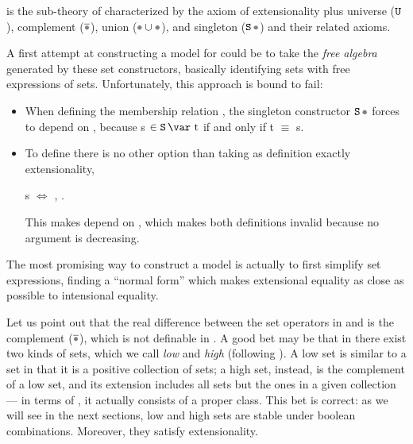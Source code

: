 
\renewcommand\INX{\coqref{NF2.Model.IN}{{\IN}}~}
\renewcommand\EQX{\coqref{NF2.Model.EQ}{{\EQ}}~}

\NFTWO{} is the sub-theory of \NF{} characterized by the axiom of extensionality plus universe ($\text{\texttt{U}}$), complement ($\Complement \Placeholder$), union ($\Union \Placeholder \Placeholder$), and singleton ($\Sing\Placeholder$) and their related axioms.


\medskip

A first attempt at constructing a model for \NFTWO{} could be to take the \emph{free algebra} generated by these set constructors, basically identifying sets with free expressions of sets. Unfortunately, this approach is bound to fail:

\begin{itemize}
  \item 
  When defining the membership relation , the singleton constructor $\Sing\Placeholder$ forces  to depend on , because \var s $\in \Sing{\text{\var t}}$ if and only if \var t $\equiv$ \var s.
  \item To define  there is no other option than taking as definition exactly extensionality, \ie{} \\
  \centerline{
   \var s  $\Leftrightarrow$ \coqdockw{\ensuremath{\forall}} ,       .}
  
  This makes  depend on , which makes both definitions invalid because no argument is decreasing.
\end{itemize}

The most promising way to construct a model is actually to first simplify set expressions, finding a ``normal form'' which makes extensional equality as close as possible to intensional equality.

Let us point out that the real difference between the set operators in \NFTWO{} and \ZF{} is the complement ($\Complement \Placeholder$), which is not definable in \ZF{}. A good bet may be that in \NFTWO{} there exist two kinds of sets, which we call \emph{low} and \emph{high} (following \cite{Forster2001}). A low set is similar to a \ZF{} set in that it is a positive collection of sets; a high set, instead, is the complement of a low set, and its extension includes all sets but the ones in a given collection --- in terms of \ZF{}, it actually consists of a proper class. This bet is correct: as we will see in the next sections, low and high sets are stable under boolean combinations. Moreover, they satisfy extensionality.

